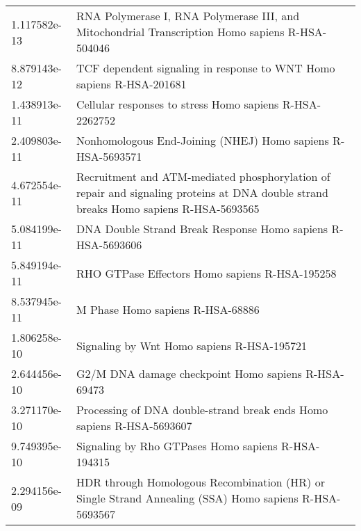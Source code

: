 \begin{longtable}{p{2.4cm}p{14.5cm}}
             1.117582e-13 &                                       RNA Polymerase I, RNA Polymerase III, and Mitochondrial Transcription Homo sapiens R-HSA-504046 \\
             8.879143e-12 &                                                                  TCF dependent signaling in response to WNT Homo sapiens R-HSA-201681 \\
             1.438913e-11 &                                                                               Cellular responses to stress Homo sapiens R-HSA-2262752 \\
             2.409803e-11 &                                                                           Nonhomologous End-Joining (NHEJ) Homo sapiens R-HSA-5693571 \\
             4.672554e-11 &  Recruitment and ATM-mediated phosphorylation of repair and signaling proteins at DNA double strand breaks Homo sapiens R-HSA-5693565 \\
             5.084199e-11 &                                                                           DNA Double Strand Break Response Homo sapiens R-HSA-5693606 \\
             5.849194e-11 &                                                                                        RHO GTPase Effectors Homo sapiens R-HSA-195258 \\
             8.537945e-11 &                                                                                                      M Phase Homo sapiens R-HSA-68886 \\
             1.806258e-10 &                                                                                            Signaling by Wnt Homo sapiens R-HSA-195721 \\
             2.644456e-10 &                                                                                   G2/M DNA damage checkpoint Homo sapiens R-HSA-69473 \\
             3.271170e-10 &                                                                 Processing of DNA double-strand break ends Homo sapiens R-HSA-5693607 \\
             9.749395e-10 &                                                                                    Signaling by Rho GTPases Homo sapiens R-HSA-194315 \\
             2.294156e-09 &                                 HDR through Homologous Recombination (HR) or Single Strand Annealing (SSA) Homo sapiens R-HSA-5693567 \\

\end{longtable}
